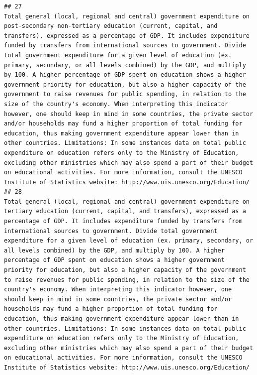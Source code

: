 \documentclass[
]{article}
\begin{document}
\begin{verbatim}
## 27                                                                                                                                                                         Total general (local, regional and central) government expenditure on post-secondary non-tertiary education (current, capital, and transfers), expressed as a percentage of GDP. It includes expenditure funded by transfers from international sources to government. Divide total government expenditure for a given level of education (ex. primary, secondary, or all levels combined) by the GDP, and multiply by 100. A higher percentage of GDP spent on education shows a higher government priority for education, but also a higher capacity of the government to raise revenues for public spending, in relation to the size of the country's economy. When interpreting this indicator however, one should keep in mind in some countries, the private sector and/or households may fund a higher proportion of total funding for education, thus making government expenditure appear lower than in other countries. Limitations: In some instances data on total public expenditure on education refers only to the Ministry of Education, excluding other ministries which may also spend a part of their budget on educational activities. For more information, consult the UNESCO Institute of Statistics website: http://www.uis.unesco.org/Education/
## 28                                                                                                                                                                                            Total general (local, regional and central) government expenditure on tertiary education (current, capital, and transfers), expressed as a percentage of GDP. It includes expenditure funded by transfers from international sources to government. Divide total government expenditure for a given level of education (ex. primary, secondary, or all levels combined) by the GDP, and multiply by 100. A higher percentage of GDP spent on education shows a higher government priority for education, but also a higher capacity of the government to raise revenues for public spending, in relation to the size of the country's economy. When interpreting this indicator however, one should keep in mind in some countries, the private sector and/or households may fund a higher proportion of total funding for education, thus making government expenditure appear lower than in other countries. Limitations: In some instances data on total public expenditure on education refers only to the Ministry of Education, excluding other ministries which may also spend a part of their budget on educational activities. For more information, consult the UNESCO Institute of Statistics website: http://www.uis.unesco.org/Education/

\end{verbatim}
\end{document}

